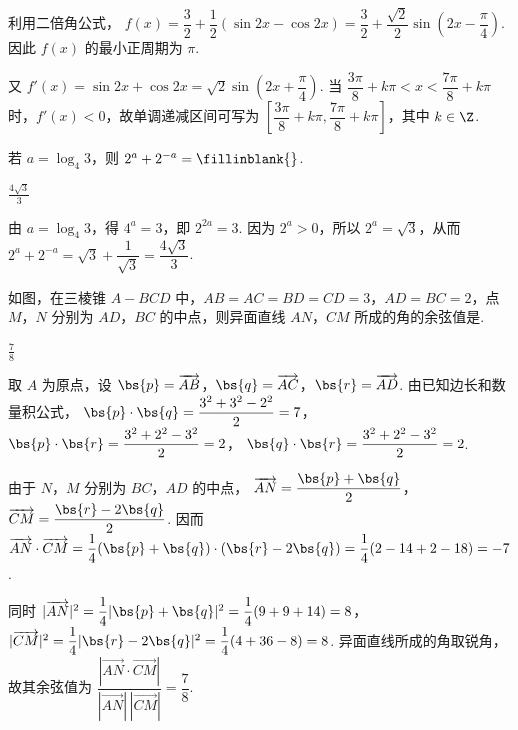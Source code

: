 \begin{solution}
利用二倍角公式，
\(f(x)=\dfrac{3}{2}+\dfrac{1}{2}(\sin2x-\cos2x)=\dfrac{3}{2}+\dfrac{\sqrt{2}}{2}\sin\left(2x-\dfrac{\pi}{4}\right)\). 因此 \(f(x)\) 的最小正周期为 \(\pi\).

又
\(f'(x)=\sin2x+\cos2x=\sqrt{2}\sin\left(2x+\dfrac{\pi}{4}\right)\). 当
\(\dfrac{3\pi}{8}+k\pi<x<\dfrac{7\pi}{8}+k\pi\) 时，\(f'(x)<0\)，故单调递减区间可写为
\(\left[\dfrac{3\pi}{8}+k\pi,\dfrac{7\pi}{8}+k\pi\right]\)，其中 \(k\in\Z\).
\end{solution}

\begin{problem}
若 \(a = \log_{4} 3\)，则 \(2^a + 2^{-a} =\fillinblank{}\).
\end{problem}

\begin{answer}
\(\frac{4\sqrt{3}}{3}\)
\end{answer}

\begin{solution}
由 \(a=\log_4 3\)，得 \(4^a=3\)，即 \(2^{2a}=3\). 因为 \(2^a>0\)，所以 \(2^a=\sqrt{3}\)，从而
\(2^a+2^{-a}=\sqrt{3}+\dfrac{1}{\sqrt{3}}=\dfrac{4\sqrt{3}}{3}\).
\end{solution}

\begin{problem}
如图，在三棱锥 \(A - BCD\) 中，\(AB = AC = BD = CD = 3\)，\(AD = BC = 2\)，点 \(M\)，\(N\) 分别为 \(AD\)，\(BC\) 的中点，则异面直线 \(AN\)，\(CM\) 所成的角的余弦值是\fillinblank{}.

\end{problem}

\begin{answer}
\(\frac{7}{8}\)
\end{answer}

\begin{solution}
取 \(A\) 为原点，设 \(\bs{p}=\overrightarrow{AB}\)，\(\bs{q}=\overrightarrow{AC}\)，\(\bs{r}=\overrightarrow{AD}\). 由已知边长和数量积公式，
\(\bs{p}\cdot\bs{q}=\dfrac{3^2+3^2-2^2}{2}=7\)，
\(\bs{p}\cdot\bs{r}=\dfrac{3^2+2^2-3^2}{2}=2\)，
\(\bs{q}\cdot\bs{r}=\dfrac{3^2+2^2-3^2}{2}=2\).

由于 \(N\)，\(M\) 分别为 \(BC\)，\(AD\) 的中点，
\(\overrightarrow{AN}=\dfrac{\bs{p}+\bs{q}}{2}\)，
\(\overrightarrow{CM}=\dfrac{\bs{r}-2\bs{q}}{2}\). 因而
\(\overrightarrow{AN}\cdot\overrightarrow{CM}
=\dfrac{1}{4}(\bs{p}+\bs{q})\cdot(\bs{r}-2\bs{q})
=\dfrac{1}{4}(2-14+2-18)=-7\).

同时
\(|\overrightarrow{AN}|^2=\dfrac{1}{4}|\bs{p}+\bs{q}|^2=\dfrac{1}{4}(9+9+14)=8\)，
\(|\overrightarrow{CM}|^2=\dfrac{1}{4}|\bs{r}-2\bs{q}|^2=\dfrac{1}{4}(4+36-8)=8\).
异面直线所成的角取锐角，故其余弦值为
\(\dfrac{|\overrightarrow{AN}\cdot\overrightarrow{CM}|}{|\overrightarrow{AN}|\,|\overrightarrow{CM}|}=\dfrac{7}{8}\).
\end{solution}

